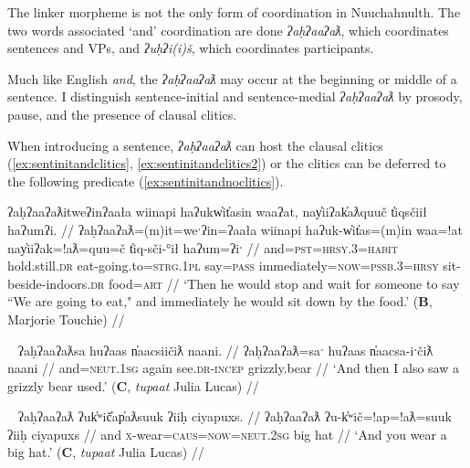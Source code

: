 The linker morpheme is not the only form of coordination in Nuuchahnulth. The two words associated `and' coordination are done \textit{ʔaḥʔaaʔaƛ}, which coordinates sentences and VPs, and \textit{ʔuḥʔi(i)š}, which coordinates participants.  %

Much like English \textit{and}, the \textit{ʔaḥʔaaʔaƛ} may occur at the beginning or middle of a sentence. I distinguish sentence-initial and sentence-medial \textit{ʔaḥʔaaʔaƛ} by prosody, pause, and the presence of clausal clitics.

When introducing a sentence, \textit{ʔaḥʔaaʔaƛ} can host the clausal clitics (\ref{ex:sentinitandclitics}, \ref{ex:sentinitandclitics2}) or the clitics can be deferred to the following predicate (\ref{ex:sentinitandnoclitics}).

\begin{comment}
Context for (): Describing a picture-story.

ʔaanamtqač̓a ʔuusuqtack̓in.
And then he got hurt a little bit.

ʔaḥʔaaʔaƛƛa ƛakišiʔeƛƛa.
And then he stands back up.
BM
\end{comment}

\ex \label{ex:sentinitandclitics}
\begingl
\glpreamble ʔaḥʔaaʔaƛitweʔinʔaała wiinapi haʔukw̓it̓asin waaʔat, nay̓iiʔak̓aƛquuč t̓iqsčiił haʔumʔi. //
\gla ʔaḥʔaaʔaƛ=(m)it=weˑʔin=ʔaała wiinapi haʔuk-w̓it̓as=(m)in waa=!at nay̓iiʔak=!aƛ=quu=č t̓iq-sči-°ił haʔum=ʔiˑ //
\glb and=\textsc{pst}=\textsc{hrsy.3}=\textsc{habit} hold.still.\textsc{dr} eat-going.to=\textsc{strg.1pl} say=\textsc{pass} immediately=\textsc{now}=\textsc{pssb.3}=\textsc{hrsy} sit-beside-indoors.\textsc{dr} food=\textsc{art} //
\glft `Then he would stop and wait for someone to say ``We are going to eat," and immediately he would sit down by the food.' (\textbf{B}, Marjorie Touchie) //
\endgl
\xe


\ex~ \label{ex:sentinitandclitics2}
\begingl
\glpreamble ʔaḥʔaaʔaƛsa huʔaas n̓aacsiičiƛ naani. //
\gla ʔaḥʔaaʔaƛ=saˑ huʔaas n̓aacsa-iˑčiƛ naani //
\glb and=\textsc{neut.1sg} again see.\textsc{dr}-\textsc{incep} grizzly.bear  //
\glft `And then I also saw a grizzly bear used.' (\textbf{C}, \textit{tupaat} Julia Lucas) //
\endgl
\xe

\ex~ \label{ex:sentinitandnoclitics}
\begingl
\glpreamble ʔaḥʔaaʔaƛ ʔuk̓ʷič̓ap̓aƛsuuk ʔiiḥ ciyapuxs. //
\gla ʔaḥʔaaʔaƛ ʔu-k̓ʷič=!ap=!aƛ=suuk ʔiiḥ ciyapuxs //
\glb and \textsc{x}-wear=\textsc{caus}=\textsc{now}=\textsc{neut.2sg} big hat //
\glft `And you wear a big hat.' (\textbf{C}, \textit{tupaat} Julia Lucas) //
\endgl
\xe

